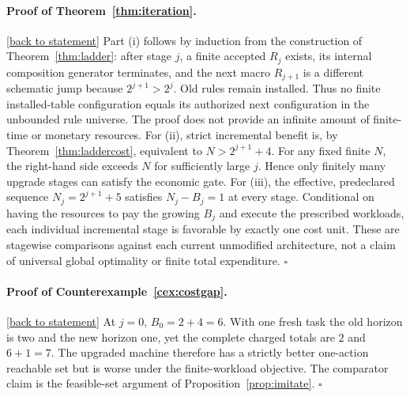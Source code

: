 \documentclass[11pt,letterpaper]{article}
\theoremstyle{definition}
\theoremstyle{remark}
\newcommand{\backlink}[1]{\hyperlink{claim:#1}{\footnotesize[back to statement]}}
\begin{document}
\paragraph{Proof of Theorem~\ref{thm:iteration}.}\hypertarget{proof:iteration}{}\backlink{iteration}
Part (i) follows by induction from the construction of Theorem~\ref{thm:ladder}: after stage $j$, a finite accepted $R_j$ exists, its internal composition generator terminates, and the next macro $R_{j+1}$ is a different schematic jump because $2^{j+1}>2^j$. Old rules remain installed. Thus no finite installed-table configuration equals its authorized next configuration in the unbounded rule universe. The proof does not provide an infinite amount of finite-time or monetary resources. For (ii), strict incremental benefit is, by Theorem~\ref{thm:laddercost}, equivalent to $N>2^{j+1}+4$. For any fixed finite $N$, the right-hand side exceeds $N$ for sufficiently large $j$. Hence only finitely many upgrade stages can satisfy the economic gate. For (iii), the effective, predeclared sequence $N_j=2^{j+1}+5$ satisfies $N_j-B_j=1$ at every stage. Conditional on having the resources to pay the growing $B_j$ and execute the prescribed workloads, each individual incremental stage is favorable by exactly one cost unit. These are stagewise comparisons against each current unmodified architecture, not a claim of universal global optimality or finite total expenditure. $\square$

\paragraph{Proof of Counterexample~\ref{cex:costgap}.}\hypertarget{proof:costgap}{}\backlink{costgap}
At $j=0$, $B_0=2+4=6$. With one fresh task the old horizon is two and the new horizon one, yet the complete charged totals are $2$ and $6+1=7$. The upgraded machine therefore has a strictly better one-action reachable set but is worse under the finite-workload objective. The comparator claim is the feasible-set argument of Proposition~\ref{prop:imitate}. $\square$
\end{document}

